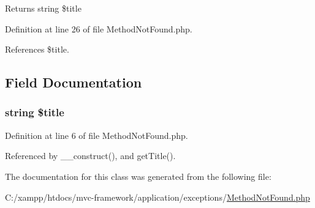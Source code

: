 \begin{DoxyReturn}{Returns}
string \$title 
\end{DoxyReturn}


Definition at line 26 of file Method\+Not\+Found.\+php.



References \$title.




\subsection{Field Documentation}
\hypertarget{class_method_not_found_a5ef02115477cfad473df2455da5a908e}{}
\subsubsection[{\$title}]{\setlength{\rightskip}{0pt plus 5cm}string \$title\hspace{0.3cm}{\ttfamily [protected]}}\label{class_method_not_found_a5ef02115477cfad473df2455da5a908e}


Definition at line 6 of file Method\+Not\+Found.\+php.



Referenced by \+\_\+\+\_\+construct(), and get\+Title().



The documentation for this class was generated from the following file\+:\begin{DoxyCompactItemize}
\item 
C\+:/xampp/htdocs/mvc-\/framework/application/exceptions/\hyperlink{_method_not_found_8php}{Method\+Not\+Found.\+php}\end{DoxyCompactItemize}
